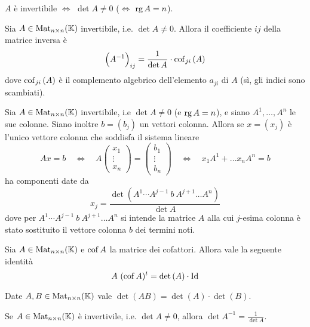 \begin{thm}[invertibilità]
	$ A $ è invertibile $ \iff $ $ \det{A} \neq 0 $ ($ \iff $ $ \operatorname{rg} A = n $).
\end{thm}

\begin{prop}
	Sia $ A \in \mathrm{Mat}_{n \times n} (\mathbb{K}) $ invertibile, i.e. $ \det A \neq 0 $. Allora il coefficiente $ ij $ della matrice inversa è \[\left(A^{-1}\right)_{ij} = \frac{1}{\det{A}} \cdot \operatorname{cof}_{ji}{(A)}\] dove $ \operatorname{cof}_{ji}{(A)} $ è il complemento algebrico dell'elemento $ a_{ji} $ di $ A $ (sì, gli indici sono scambiati).   
\end{prop}

\begin{thm}
	Sia $ A \in \mathrm{Mat}_{n \times n} (\mathbb{K}) $ invertibile, i.e $ \det A \neq 0 $ (e $ \operatorname{rg} A = n $), e siano $ A^{1}, \ldots, A^{n} $ le sue colonne. Siano inoltre $ b = (b_j) $ un vettori colonna. Allora se $ x = (x_j) $ è l'unico vettore colonna che soddisfa il sistema lineare 
	\[Ax = b \quad \iff \quad A \begin{pmatrix} x_1 \\ \vdots \\ x_n \end{pmatrix} = \begin{pmatrix} b_1 \\ \vdots \\ b_n \end{pmatrix} \quad \iff \quad x_1 A^{1} + \ldots x_n A^{n} = b\]
	ha componenti date da 
	\[x_j = \frac{\det{\left(A^{1} \cdots A^{j - 1} \ b \ A^{j + 1} \ldots A^{n}\right)}}{\det{A}}\]
	dove per $ A^{1} \cdots A^{j - 1} \ b \ A^{j + 1} \ldots A^{n} $ si intende la matrice $ A $ alla cui $ j $-esima colonna è stato sostituito il vettore colonna $ b $ dei termini noti.  
\end{thm}

\begin{corollary}
	Sia $ A \in \mathrm{Mat}_{n \times n} (\mathbb{K}) $ e $ \operatorname{cof}{A} $ la matrice dei cofattori. Allora vale la seguente identità \[A \ (\operatorname{cof}{A})^{t} = \det{(A)} \cdot \mathrm{Id}\]
\end{corollary}

\begin{thm}[di Binet]
	Date $ A, B \in \mathrm{Mat}_{n \times n} (\mathbb{K}) $ vale $ \det{(AB)} = \det{(A)} \cdot \det{(B)} $. 
\end{thm}

\begin{corollary}
	Se $ A \in \mathrm{Mat}_{n \times n} (\mathbb{K}) $ è invertivile, i.e. $ \det{A} \neq 0 $, allora $ \det{A^{-1}} = \frac{1}{\det{A}} $. 
\end{corollary}

